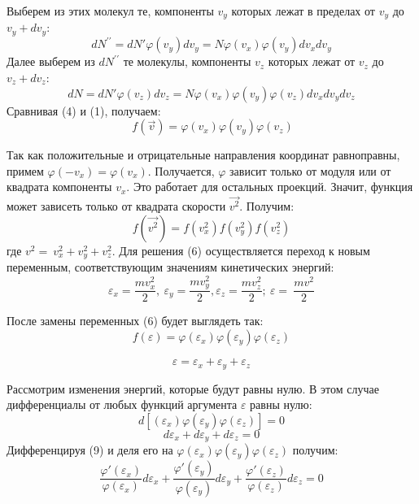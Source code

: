 \documentclass[a4paper,12pt]{article}
\begin{document}
Выберем из этих молекул те, компоненты $v_y$ которых лежат в пределах от $v_y$ до $v_y+dv_y$:
\begin{equation}
dN^{\prime\prime}=dN'\varphi\left(v_y \right)dv_y = N\varphi\left(v_x \right)\varphi\left(v_y \right)dv_xdv_y
\end{equation}
Далее выберем из $dN^{\prime\prime}$ те молекулы, компоненты $v_z$ которых лежат от $v_z$ до $v_z+dv_z$:
\begin{equation}
dN=dN'\varphi\left(v_z\right)dv_z= N\varphi\left(v_x \right)\varphi\left(v_y \right)\varphi\left(v_z \right)dv_xdv_ydv_z
\end{equation}
Сравнивая (4) и (1), получаем:
\begin{equation}
\ f\left(\vec{v}\right)=\varphi\left(v_x \right)\varphi\left(v_y \right)\varphi\left(v_z \right)
\end{equation}

Так как положительные и отрицательные направления координат равноправны, примем $\varphi\left(-v_x \right)= \varphi\left(v_x \right)$. Получается, $\varphi$ зависит только от модуля или от квадрата компоненты $v_x$. Это работает для остальных проекций. Значит, функция может зависеть только от квадрата скорости $\vec{v^2}$. Получим:
\begin{equation}
f\left(\vec{v^2}\right)=f\left(v_x^2\right)f\left(v_y^2\right)f\left(v_z^2\right)
\end{equation}
где $v^2=\ v_x^2+v_y^2+v_z^2$.
Для решения (6) осуществляется переход к новым переменным, соответствующим значениям кинетических энергий:
$$\varepsilon_x=\frac{mv_x^2}{2},\ \varepsilon_y=\frac{mv_y^2}{2}, \varepsilon_z=\frac{mv_z^2}{2};\ \varepsilon=\ \frac{mv^2}{2}$$

После замены переменных (6) будет выглядеть так:
\begin{equation}
f(\varepsilon)=\varphi\left(\varepsilon_x\right)\varphi\left(\varepsilon_y\right)\varphi\left(\varepsilon_z\right)
\end{equation}

\begin{equation}
\varepsilon=\varepsilon_x+\varepsilon_y+\varepsilon_z 
\end{equation}

Рассмотрим изменения энергий, которые будут равны нулю. В этом случае дифференциалы от любых функций аргумента $\varepsilon$ равны нулю:
\begin{equation}
d\left[\left(\varepsilon_x\right)\varphi\left(\varepsilon_y\right)\varphi\left(\varepsilon_z\right)\right]=0\end{equation}
\begin{equation}
d\varepsilon_x+d\varepsilon_y+d\varepsilon_z=0
\end{equation}
Дифференцируя (9) и деля его на $\varphi\left(\varepsilon_x\right)\varphi\left(\varepsilon_y\right)\varphi\left(\varepsilon_z\right)$ получим:
\begin{equation}
\frac{\varphi\prime\left(\varepsilon_x\right)}{\varphi\left(\varepsilon_x\right)}d\varepsilon_x+\frac{\varphi\prime\left(\varepsilon_y\right)}{\varphi\left(\varepsilon_y\right)}d\varepsilon_y+\frac{\varphi\prime\left(\varepsilon_z\right)}{\varphi\left(\varepsilon_z\right)}d\varepsilon_z=0
\end{equation}
\end{document}
